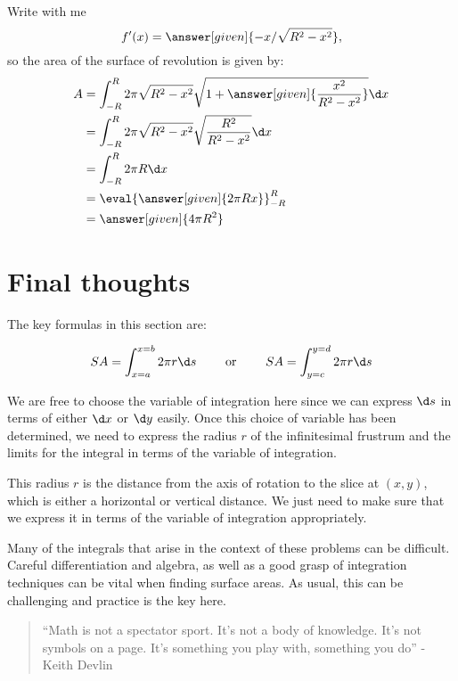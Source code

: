 \documentclass{ximera}
\begin{document}
\begin{example}
\begin{explanation}
\begin{image}
    \end{image}
    Write with me
    \[
    f'(x) = \answer[given]{-x/\sqrt{R^2-x^2}},
    \]
  so the area of the surface of revolution is given by:
  \begin{align*}
    A&=\int_{-R }^R 2\pi \sqrt{R^2 - x^2}\sqrt{1+\answer[given]{\frac{x^2}{R^2-x^2}}}\d x \\
    &=\int_{-R }^R 2\pi \sqrt{R^2 - x^2}\sqrt{\frac{R^2}{R^2-x^2}}\d x \\
    &=\int_{-R }^R 2\pi R \d x\\
    &=\eval{\answer[given]{2 \pi R x}}_{-R}^R\\
    &=\answer[given]{4\pi R^2}
  \end{align*}
\end{explanation}
\end{example}


\section{Final thoughts}
The key formulas in this section are:

\[
SA=\int_{x=a}^{x=b} 2 \pi r \d s \qquad \textrm{ or }  \qquad SA=\int_{y=c}^{y=d} 2 \pi r \d s
\]

We are free to choose the variable of integration here since we can express $\d s$ in terms of either $\d x$ or $\d y$ easily.  Once this choice of variable has been determined, we need to express the radius $r$ of the infinitesimal frustrum and the limits for the integral in terms of the variable of integration.  

This radius $r$ is the distance from the axis of rotation to the slice at $(x,y)$, which is either a horizontal or vertical distance.  We just need to make sure that we express it in terms of the variable of integration appropriately.

Many of the integrals that arise in the context of these problems can be difficult.  Careful differentiation and algebra, as well as a good grasp of integration techniques can be vital when finding surface areas.  As usual, this can be challenging and practice is the key here.

\begin{quote}
``Math is not a spectator sport.  It's not a body of knowledge.  It's not symbols on a page. It's something you play with, something you do'' - Keith Devlin
\end{quote}
\end{document}
